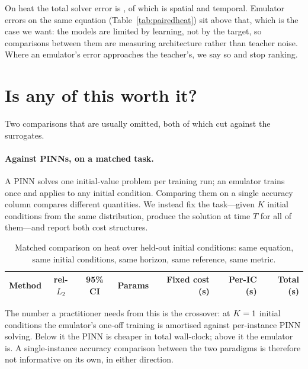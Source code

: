 \documentclass{article}
\begin{document}
On heat the total solver error is \teacherHeatTotal{}, of which \teacherHeatSpatial{} is
spatial and \teacherHeatTemporal{} temporal. Emulator errors on the same equation
(Table~\ref{tab:pairedheat}) sit above that, which is the case we want: the models are
limited by learning, not by the target, so comparisons between them are measuring
architecture rather than teacher noise. Where an emulator's error approaches the teacher's,
we say so and stop ranking.

\section{Is any of this worth it?}
\label{sec:worth}

Two comparisons that are usually omitted, both of which cut against the surrogates.

\paragraph{Against PINNs, on a matched task.} A PINN solves one initial-value problem per
training run; an emulator trains once and applies to any initial condition. Comparing them
on a single accuracy column compares different quantities. We instead fix the task---given
$K$ initial conditions from the same distribution, produce the solution at time $T$ for all
of them---and report both cost structures.

\begin{table}[h]
\centering
\caption{Matched comparison on heat over \matchedK{} held-out initial conditions: same
equation, same initial conditions, same horizon, same reference, same metric.}
\label{tab:matched}
\small
\begin{tabular}{lccrrrr}
\toprule
Method & rel-$L_2$ & 95\% CI & Params & Fixed cost (s) & Per-IC (s) & Total (s) \\
\midrule

\bottomrule
\end{tabular}
\end{table}

The number a practitioner needs from this is the crossover: at $K = 1{}$
initial conditions the emulator's one-off training is amortised against per-instance PINN
solving. Below it the PINN is cheaper in total wall-clock; above it the emulator is. A
single-instance accuracy comparison between the two paradigms is therefore not
informative on its own, in either direction.
\end{document}
